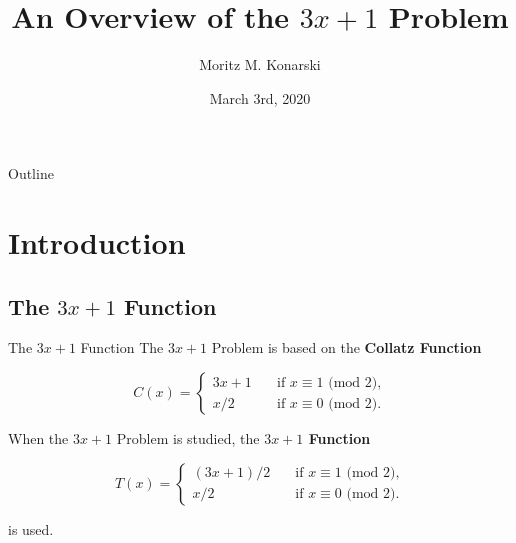 \documentclass[hyperref={colorlinks,allcolors=black}]{beamer}
\title[$3x+1$ Problem]{An Overview of the $3x+1$ Problem}
\author[M. Konarski]{Moritz M. Konarski}
\institute[AUCA]{Applied Mathematics Department \newline 
    American University of Central Asia}
\date{March 3rd, 2020}
\begin{document}
\begin{frame}
  \titlepage
\end{frame}

\begin{frame}{Outline}
  \tableofcontents
\end{frame}


\section{Introduction}

\subsection[Function]{The $3x+1$ Function}


\begin{frame}{The $3x+1$ Function}
The $3x+1$ Problem is based on the \textbf{Collatz Function}

\begin{equation}
\nonumber
C(x)= \left\{
    \begin{array}{ll}
        3x+1 \quad &\text{if } x \equiv 1 \text{ (mod 2),} \\
        x/2 \quad &\text{if } x \equiv 0 \text{ (mod 2).}
    \end{array}
\right.
\end{equation}

When the $3x+1$ Problem is studied, the \textbf{$3x+1$ Function}

\begin{equation}
\nonumber
T(x)= \left\{
    \begin{array}{ll}
        (3x+1)/2 \quad &\text{if } x \equiv 1 \text{ (mod 2),} \\
        x/2 \quad &\text{if } x \equiv 0 \text{ (mod 2).}
    \end{array}
\right.
\end{equation}

is used.
\end{frame}

\end{document}
